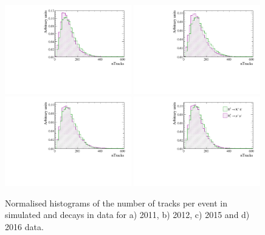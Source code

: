 \begin{figure}[tbp]
  \centering
    \includegraphics[width=0.49\textwidth]{./Figs/LifetimeMeasurement/nTracks_2011_Bs2MuMu_Bd2KPi.pdf}
    \includegraphics[width=0.49\textwidth]{./Figs/LifetimeMeasurement/nTracks_2012_Bs2MuMu_Bd2KPi.pdf}
    \includegraphics[width=0.49\textwidth]{./Figs/LifetimeMeasurement/nTracks_2015_Bs2MuMu_Bd2KPi.pdf}
    \includegraphics[width=0.49\textwidth]{./Figs/LifetimeMeasurement/nTracks_2016_Bs2MuMu_Bd2KPi.pdf}
  \caption{Normalised histograms of the number of tracks per event in simulated \bdkpi and \bsmumu decays in data for a) 2011, b) 2012, c) 2015 and d) 2016 data.}%
  \label{fig:BsmmVsBdToKpinTracks}
\end{figure}


